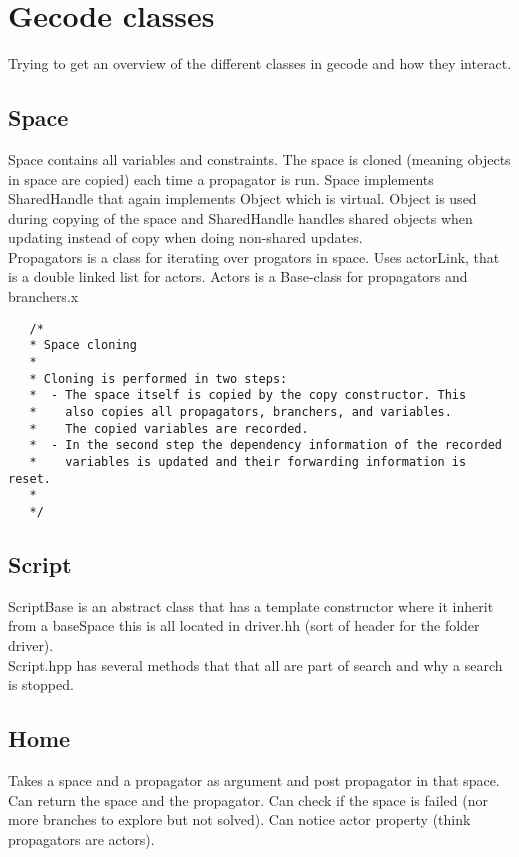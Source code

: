 \documentclass[a4paper,10pt]{article}
\title{}
\author{}
\begin{document}
\section{Gecode classes}
Trying to get an overview of the different classes in gecode and how they interact.
\subsection{Space}
Space contains all variables and constraints. The space is cloned (meaning objects in space are copied) each time a 
propagator is run. Space implements SharedHandle that again implements Object which is virtual. Object is used during 
copying of the space and SharedHandle handles shared objects when updating instead of copy when doing non-shared 
updates. \\ 
Propagators is a class for iterating over progators in space. Uses actorLink, that is a double linked list for actors. 
Actors is a Base-class for propagators and branchers.x

\begin{verbatim}
   /*
   * Space cloning
   *
   * Cloning is performed in two steps:
   *  - The space itself is copied by the copy constructor. This
   *    also copies all propagators, branchers, and variables.
   *    The copied variables are recorded.
   *  - In the second step the dependency information of the recorded
   *    variables is updated and their forwarding information is reset.
   *
   */
\end{verbatim}
\subsection{Script}
ScriptBase is an abstract class that has a template constructor where it inherit from a baseSpace this is all 
located in driver.hh (sort of header for the folder driver). \\
Script.hpp has several methods that that all are part of search and why a search is stopped. 
\subsection{Home}
Takes a space and a propagator as argument and post propagator in that space. Can return the space and the propagator. 
Can check if the space is failed (nor more branches to explore but not solved). Can notice actor property (think 
propagators are actors). 
\end{document}
